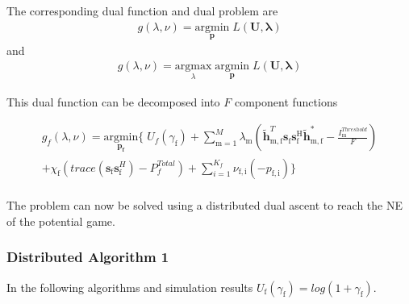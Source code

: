 \documentclass[12pt,a4paper]{report}
\begin{document}
The corresponding dual function and dual problem are  
\begin{gather*}
g(\lambda,\nu) = \underset{\mathbf{p}}{\mathrm{argmin}}\;L(\mathbf{U,\lambda})
\end{gather*}
and 
\begin{gather*}
g(\lambda,\nu) = \underset{\lambda}{\mathrm{argmax}}\;\underset{\mathbf{p}}{\mathrm{argmin}}\;L(\mathbf{U,\lambda})
\end{gather*}

This dual function can be decomposed into $F$ component functions


\begin{multline}
g_f(\lambda,\nu) = \underset{\mathbf{p_f}}{\mathrm{argmin}}
\{
\;
U_f(\gamma_{\text{f}}) 
+
\sum_{\mathrm{m=1}}^M \lambda_{\mathrm{m}}
(\mathbf{\tilde{h}}_{\mathrm{m,f}}^T  \mathbf{s}_{\mathrm{f}} 						
	\mathbf{s_{\mathrm{f}}^{\mathrm{H}}} \mathbf{\tilde{h}_{\mathrm{m,f}}^*} - \frac{I^{Threshold}_{\mathrm{m}}}{F})
\\
+ 
\chi_{\mathrm{f}}(trace(\mathbf{s}_\mathrm{f}\mathbf{s}_\mathrm{f}^H)-P^{Total}_{f} )
+
\sum_{i=1}^{K_f}
\nu_{\mathrm{f,i}}(-p_{\mathrm{f,i}})\}
\end{multline}
\\

The problem can now be solved using a distributed dual ascent to reach the NE of the potential game. 
\subsubsection{Distributed Algorithm 1}\label{algo1}
In the following algorithms and simulation results $U_{\text{f}}(\gamma_{\text{f}}) = log(1+\gamma_{\text{f}})$.
\end{document}
